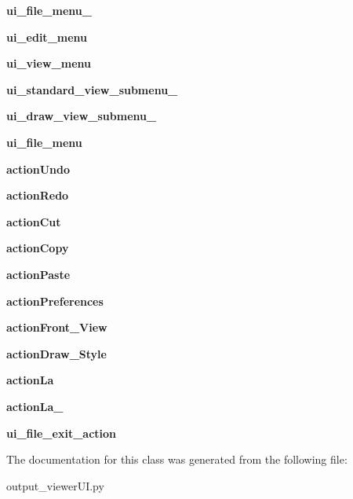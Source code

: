 \begin{DoxyCompactItemize}
\hypertarget{a00099_ad42c5a1028285e160bfb9eb048cd245b}{}\label{a00099_ad42c5a1028285e160bfb9eb048cd245b} 
{\bfseries ui\+\_\+file\+\_\+menu\+\_\+}
\item 
\hypertarget{a00099_a791ff2e9d4693638b8e5220f53f1b8d2}{}\label{a00099_a791ff2e9d4693638b8e5220f53f1b8d2} 
{\bfseries ui\+\_\+edit\+\_\+menu}
\item 
\hypertarget{a00099_aaf13351c59caceedfc932c46217b4cda}{}\label{a00099_aaf13351c59caceedfc932c46217b4cda} 
{\bfseries ui\+\_\+view\+\_\+menu}
\item 
\hypertarget{a00099_a6d61f7e62a75570f3cbb6b5c9553081b}{}\label{a00099_a6d61f7e62a75570f3cbb6b5c9553081b} 
{\bfseries ui\+\_\+standard\+\_\+view\+\_\+submenu\+\_\+}
\item 
\hypertarget{a00099_a5c5ae1d1afe30f77e2be3526c82acd05}{}\label{a00099_a5c5ae1d1afe30f77e2be3526c82acd05} 
{\bfseries ui\+\_\+draw\+\_\+view\+\_\+submenu\+\_\+}
\item 
\hypertarget{a00099_abf378391cb97c7daa1dcc7458ae26d29}{}\label{a00099_abf378391cb97c7daa1dcc7458ae26d29} 
{\bfseries ui\+\_\+file\+\_\+menu}
\item 
\hypertarget{a00099_a885e2a1ee5a96a1e7c1a336ecdd02518}{}\label{a00099_a885e2a1ee5a96a1e7c1a336ecdd02518} 
{\bfseries action\+Undo}
\item 
\hypertarget{a00099_a732cf29558af5ac0db109050e93d03a0}{}\label{a00099_a732cf29558af5ac0db109050e93d03a0} 
{\bfseries action\+Redo}
\item 
\hypertarget{a00099_a20b08adb5b2b3e4f97465cfbdd5c4d27}{}\label{a00099_a20b08adb5b2b3e4f97465cfbdd5c4d27} 
{\bfseries action\+Cut}
\item 
\hypertarget{a00099_a591e47cae22ade3a6bd2a57754db9141}{}\label{a00099_a591e47cae22ade3a6bd2a57754db9141} 
{\bfseries action\+Copy}
\item 
\hypertarget{a00099_a0605f6f6261e3019d29e471b368398ed}{}\label{a00099_a0605f6f6261e3019d29e471b368398ed} 
{\bfseries action\+Paste}
\item 
\hypertarget{a00099_a80387a6115341ac316c2582ffefd7ab1}{}\label{a00099_a80387a6115341ac316c2582ffefd7ab1} 
{\bfseries action\+Preferences}
\item 
\hypertarget{a00099_a808772e632be99f7d84eccedca596604}{}\label{a00099_a808772e632be99f7d84eccedca596604} 
{\bfseries action\+Front\+\_\+\+View}
\item 
\hypertarget{a00099_aa11ed317a9625aff4fd5a794dc570520}{}\label{a00099_aa11ed317a9625aff4fd5a794dc570520} 
{\bfseries action\+Draw\+\_\+\+Style}
\item 
\hypertarget{a00099_aa992117bc609f60f393c8fff5b5dc89f}{}\label{a00099_aa992117bc609f60f393c8fff5b5dc89f} 
{\bfseries action\+La}
\item 
\hypertarget{a00099_a0e5b34f7aad679ffb90131f69372304a}{}\label{a00099_a0e5b34f7aad679ffb90131f69372304a} 
{\bfseries action\+La\+\_}
\item 
\hypertarget{a00099_a825bab69ddd68d04989a3f919debb14f}{}\label{a00099_a825bab69ddd68d04989a3f919debb14f} 
{\bfseries ui\+\_\+file\+\_\+exit\+\_\+action}
\end{DoxyCompactItemize}


The documentation for this class was generated from the following file\+:\begin{DoxyCompactItemize}
\item 
output\+\_\+viewer\+U\+I.\+py\end{DoxyCompactItemize}
